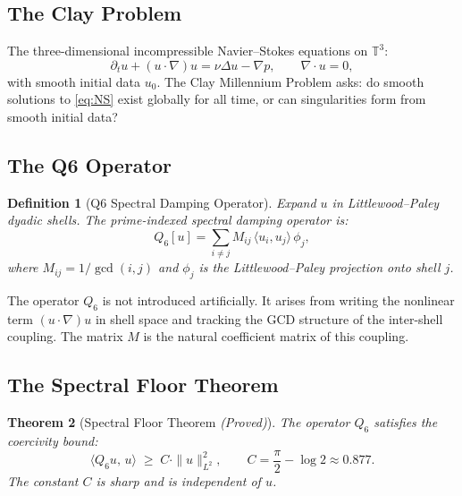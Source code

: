 \documentclass[12pt]{article}
\newtheorem{theorem}{Theorem}[section]
\newtheorem{definition}[theorem]{Definition}
\begin{document}
\subsection{The Clay Problem}

The three-dimensional incompressible Navier--Stokes equations
on $\mathbb{T}^3$:
\begin{equation}
\partial_t u + (u \cdot \nabla)u = \nu \Delta u - \nabla p,
\qquad \nabla \cdot u = 0,
\label{eq:NS}
\end{equation}
with smooth initial data $u_0$. The Clay Millennium Problem
asks: do smooth solutions to \eqref{eq:NS} exist globally
for all time, or can singularities form from smooth initial data?

\subsection{The Q6 Operator}

\begin{definition}[Q6 Spectral Damping Operator]
\label{def:Q6}
Expand $u$ in Littlewood--Paley dyadic shells. The
prime-indexed spectral damping operator is:
\begin{equation}
Q_6[u] = \sum_{i \neq j}
M_{ij}\,\langle u_i, u_j \rangle\,\phi_j,
\label{eq:Q6}
\end{equation}
where $M_{ij} = 1/\gcd(i,j)$ and $\phi_j$ is the
Littlewood--Paley projection onto shell $j$.
\end{definition}

The operator $Q_6$ is not introduced artificially.
It arises from writing the nonlinear term $(u \cdot \nabla)u$
in shell space and tracking the GCD structure of the
inter-shell coupling. The matrix $M$ is the natural
coefficient matrix of this coupling.

\subsection{The Spectral Floor Theorem}

\begin{theorem}[Spectral Floor Theorem \emph{(Proved)}]
\label{thm:floor}
The operator $Q_6$ satisfies the coercivity bound:
\begin{equation}
\langle Q_6 u,\, u \rangle \;\geq\; C \cdot \|u\|_{L^2}^2,
\qquad C = \frac{\pi}{2} - \log 2 \approx 0.877.
\label{eq:coercivity}
\end{equation}
The constant $C$ is sharp and is independent of $u$.
\end{theorem}
\end{document}
